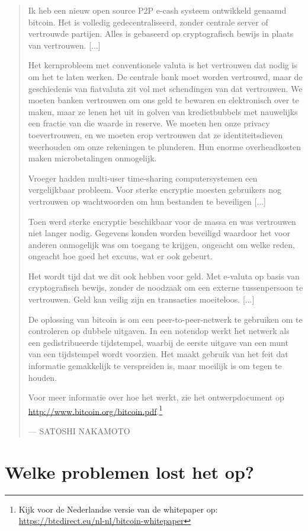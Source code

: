 \documentclass[
  letterpaper,
]{scrbook}
\begin{document}
\begin{quote}
Ik heb een nieuw open source P2P e-cash systeem ontwikkeld genaamd
bitcoin. Het is volledig gedecentraliseerd, zonder centrale server of
vertrouwde partijen. Alles is gebaseerd op cryptografisch bewijs in
plaats van vertrouwen. {[}...{]}

Het kernprobleem met conventionele valuta is het vertrouwen dat nodig is
om het te laten werken. De centrale bank moet worden vertrouwd, maar de
geschiedenis van fiatvaluta zit vol met schendingen van dat vertrouwen.
We moeten banken vertrouwen om ons geld te bewaren en elektronisch over
te maken, maar ze lenen het uit in golven van kredietbubbels met
nauwelijks een fractie van die waarde in reserve. We moeten hen onze
privacy toevertrouwen, en we moeten erop vertrouwen dat ze
identiteitsdieven weerhouden om onze rekeningen te plunderen. Hun enorme
overheadkosten maken microbetalingen onmogelijk.

Vroeger hadden multi-user time-sharing computersystemen een
vergelijkbaar probleem. Voor sterke encryptie moesten gebruikers nog
vertrouwen op wachtwoorden om hun bestanden te beveiligen {[}...{]}

Toen werd sterke encryptie beschikbaar voor de massa en was vertrouwen
niet langer nodig. Gegevens konden worden beveiligd waardoor het voor
anderen onmogelijk was om toegang te krijgen, ongeacht om welke reden,
ongeacht hoe goed het excuus, wat er ook gebeurt.

Het wordt tijd dat we dit ook hebben voor geld. Met e-valuta op basis
van cryptografisch bewijs, zonder de noodzaak om een externe
tussenpersoon te vertrouwen. Geld kan veilig zijn en transacties
moeiteloos. {[}...{]}

De oplossing van bitcoin is om een peer-to-peer-netwerk te gebruiken om
te controleren op dubbele uitgaven. In een notendop werkt het netwerk
als een gedistribueerde tijdstempel, waarbij de eerste uitgave van een
munt van een tijdstempel wordt voorzien. Het maakt gebruik van het feit
dat informatie gemakkelijk te verspreiden is, maar moeilijk is om tegen
te houden.

Voor meer informatie over hoe het werkt, zie het ontwerpdocument op
\url{http://www.bitcoin.org/bitcoin.pdf}.\footnote{Kijk voor de
  Nederlandse versie van de whitepaper op:
  \url{https://btcdirect.eu/nl-nl/bitcoin-whitepaper}}

--- {SATOSHI NAKAMOTO}
\end{quote}

\hypertarget{welke-problemen-lost-het-op}{%
\section{Welke problemen lost het
op?}\label{welke-problemen-lost-het-op}}
\end{document}
